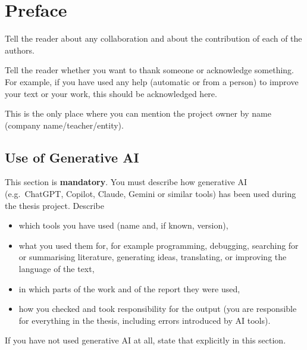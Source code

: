 \chapter*{Preface}
\begin{instructions}
Tell the reader about any collaboration and about the contribution of each of the authors.

Tell the reader whether you want to thank someone or acknowledge something. For example, if you have used any help (automatic or from a person) to improve your text or your work, this should be acknowledged here.

This is the only place where you can mention the project owner by name (company name/teacher/entity).
\end{instructions}

\section*{Use of Generative AI }
\label{sec:genai}
\begin{instructions}
This section is \textbf{mandatory}. You must describe how generative AI (e.g.\ ChatGPT, Copilot, Claude, Gemini or similar tools) has been used during the thesis project. Describe
\begin{itemize}
    \item which tools you have used (name and, if known, version),
    \item what you used them for, for example programming, debugging, searching for or summarising literature, generating ideas, translating, or improving the language of the text,
    \item in which parts of the work and of the report they were used,
    \item how you checked and took responsibility for the output (you are responsible for everything in the thesis, including errors introduced by AI tools).
\end{itemize}
If you have not used generative AI at all, state that explicitly in this section.
\end{instructions}
